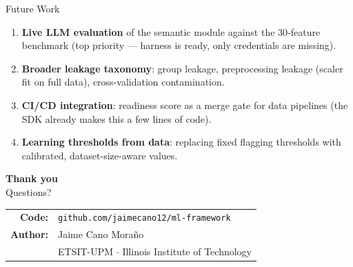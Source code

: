 \documentclass[11pt,aspectratio=169]{beamer}
\begin{document}
\begin{frame}{Future Work}
  \begin{enumerate}\setlength\itemsep{0.8em}
    \item \textbf{Live LLM evaluation} of the semantic module against the 30-feature benchmark (top priority --- harness is ready, only credentials are missing).
    \item \textbf{Broader leakage taxonomy}: group leakage, preprocessing leakage (scaler fit on full data), cross-validation contamination.
    \item \textbf{CI/CD integration}: readiness score as a merge gate for data pipelines (the SDK already makes this a few lines of code).
    \item \textbf{Learning thresholds from data}: replacing fixed flagging thresholds with calibrated, dataset-size-aware values.
  \end{enumerate}
\end{frame}

\begin{frame}
  \begin{center}
    {\LARGE\bfseries\textcolor{upmBlue}{Thank you}}\\[1.2em]
    {\large Questions?}\\[2em]
    \begin{tabular}{rl}
      \textbf{Code:} & \texttt{github.com/jaimecano12/ml-framework} \\[0.3em]
      \textbf{Author:} & Jaime Cano Moraño \\[0.3em]
      & \footnotesize ETSIT-UPM $\cdot$ Illinois Institute of Technology \\
    \end{tabular}
  \end{center}
\end{frame}
\end{document}
